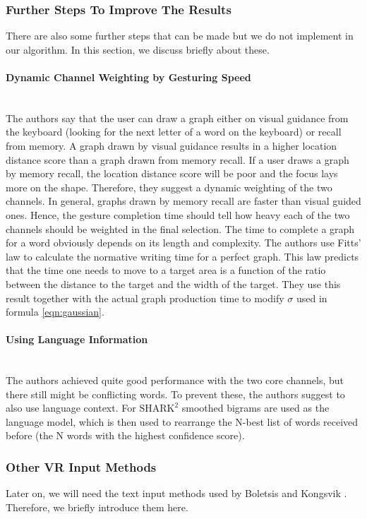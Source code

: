 \subsubsection{Further Steps To Improve The Results}
There are also some further steps that can be made but we do not implement in our algorithm. In this section, we discuss briefly about these.
\paragraph{Dynamic Channel Weighting by Gesturing Speed}\
\label{gesturing speed}\\
The authors say that the user can draw a graph either on visual guidance from the keyboard (looking for the next letter of a word on the keyboard) or recall from memory. A graph drawn by visual guidance results in a higher location distance score than a graph drawn from memory recall. If a user draws a graph by memory recall, the location distance score will be poor and the focus lays more on the shape. Therefore, they suggest a dynamic weighting of the two channels. In general, graphs drawn by memory recall are faster than visual guided ones. Hence, the gesture completion time should tell how heavy each of the two channels should be weighted in the final selection. The time to complete a graph for a word obviously depends on its length and complexity. The authors use Fitts' law to calculate the normative writing time for a perfect graph. This law predicts that the time one needs to move to a target area is a function of the ratio between the distance to the target and the width of the target. They use this result together with the actual graph production time to modify $\sigma$ used in formula \ref{eqn:gaussian}.
\paragraph{Using Language Information}\ \\
The authors achieved quite good performance with the two core channels, but there still might be conflicting words. To prevent these, the authors suggest to also use language context. For $\text{SHARK}^2$ smoothed bigrams are used as the language model, which is then used to rearrange the N-best list of words received before (the N words with the highest confidence score).

\subsubsection{Other VR Input Methods}
Later on, we will need the text input methods used by Boletsis and Kongsvik \cite{Boletsis2019ControllerbasedTT}. Therefore, we briefly introduce them here.\\


